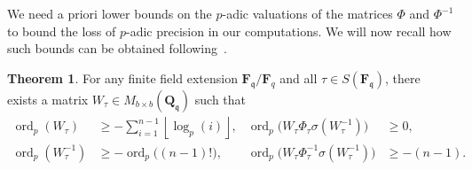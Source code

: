 \documentclass[a4paper,11pt]{article}
\numberwithin{equation}{section}
\providecommand{\floor}[1]{\left\lfloor#1\right\rfloor}   %
\newcommand{\QQ}{\mathbf{Q}} %
\newcommand{\FF}{\mathbf{F}} %
\DeclareMathOperator{\ord}{ord}          %
\theoremstyle{definition}
\newtheorem{thm}{Theorem}[section]
\begin{document}
We need a priori lower bounds on the $p$-adic valuations of the matrices 
$\Phi$ and $\Phi^{-1}$ to bound the loss of $p$-adic precision in our 
computations. We will now recall how such bounds can be obtained 
following~\citep{AbbottKedlayaRoe2006}.

\begin{thm} \label{thm:deltabound}
For any finite field extension $\FF_{\mathfrak{q}}/\FF_q$ and
all $\tau \in S(\FF_{\mathfrak{q}})$, 
there exists a matrix $W_{\tau} \in M_{b \times b}(\QQ_{\mathfrak{q}})$ such that 
\begin{align*}
\ord_p(W_{\tau}) &\geq -\sum_{i=1}^{n-1} \floor{\log_p(i)},
&\ord_p\bigl(W_{\tau} \Phi_{\tau} \sigma(W_{\tau}^{-1})\bigr) &\geq  0, \\
\ord_p(W_{\tau}^{-1}) &\geq -\ord_p \bigl((n-1)! \bigr),
&\ord_p\bigl(W_{\tau} \Phi_{\tau}^{-1} \sigma(W_{\tau}^{-1})\bigr) &\geq  -(n-1).
\end{align*}
\end{thm}
\end{document}
